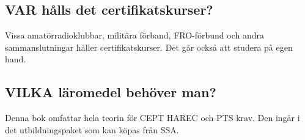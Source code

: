 \subsection*{VAR hålls det certifikatskurser?}

Vissa amatörradioklubbar, militära förband,
FRO-förbund och andra sammanslutningar
håller certifikatskurser. Det går också att
studera på egen hand.

\subsection*{VILKA läromedel behöver man?}

Denna bok omfattar hela teorin för CEPT HAREC och PTS krav.
Den ingår i det utbildningspaket som kan köpas från SSA.

